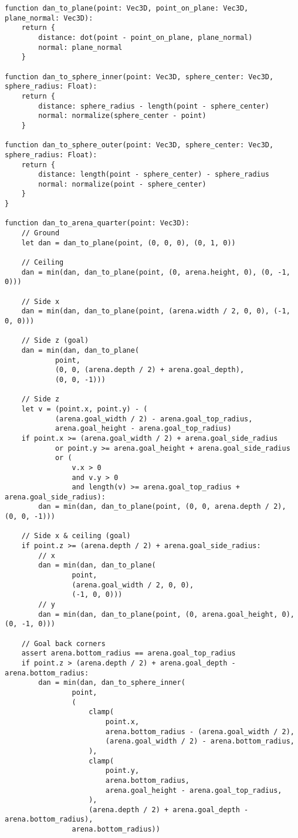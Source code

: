 \begin{verbatim}
function dan_to_plane(point: Vec3D, point_on_plane: Vec3D, plane_normal: Vec3D):
    return {
        distance: dot(point - point_on_plane, plane_normal)
        normal: plane_normal
    }

function dan_to_sphere_inner(point: Vec3D, sphere_center: Vec3D, sphere_radius: Float):
    return {
        distance: sphere_radius - length(point - sphere_center)
        normal: normalize(sphere_center - point)
    }

function dan_to_sphere_outer(point: Vec3D, sphere_center: Vec3D, sphere_radius: Float):
    return {
        distance: length(point - sphere_center) - sphere_radius
        normal: normalize(point - sphere_center)
    }
}

function dan_to_arena_quarter(point: Vec3D):
    // Ground
    let dan = dan_to_plane(point, (0, 0, 0), (0, 1, 0))

    // Ceiling
    dan = min(dan, dan_to_plane(point, (0, arena.height, 0), (0, -1, 0)))

    // Side x
    dan = min(dan, dan_to_plane(point, (arena.width / 2, 0, 0), (-1, 0, 0)))

    // Side z (goal)
    dan = min(dan, dan_to_plane(
            point,
            (0, 0, (arena.depth / 2) + arena.goal_depth),
            (0, 0, -1)))

    // Side z
    let v = (point.x, point.y) - (
            (arena.goal_width / 2) - arena.goal_top_radius,
            arena.goal_height - arena.goal_top_radius)
    if point.x >= (arena.goal_width / 2) + arena.goal_side_radius
            or point.y >= arena.goal_height + arena.goal_side_radius
            or (
                v.x > 0
                and v.y > 0
                and length(v) >= arena.goal_top_radius + arena.goal_side_radius):
        dan = min(dan, dan_to_plane(point, (0, 0, arena.depth / 2), (0, 0, -1)))

    // Side x & ceiling (goal)
    if point.z >= (arena.depth / 2) + arena.goal_side_radius:
        // x
        dan = min(dan, dan_to_plane(
                point,
                (arena.goal_width / 2, 0, 0),
                (-1, 0, 0)))
        // y
        dan = min(dan, dan_to_plane(point, (0, arena.goal_height, 0), (0, -1, 0)))

    // Goal back corners
    assert arena.bottom_radius == arena.goal_top_radius
    if point.z > (arena.depth / 2) + arena.goal_depth - arena.bottom_radius:
        dan = min(dan, dan_to_sphere_inner(
                point,
                (
                    clamp(
                        point.x,
                        arena.bottom_radius - (arena.goal_width / 2),
                        (arena.goal_width / 2) - arena.bottom_radius,
                    ),
                    clamp(
                        point.y,
                        arena.bottom_radius,
                        arena.goal_height - arena.goal_top_radius,
                    ),
                    (arena.depth / 2) + arena.goal_depth - arena.bottom_radius),
                arena.bottom_radius))


\end{verbatim}
